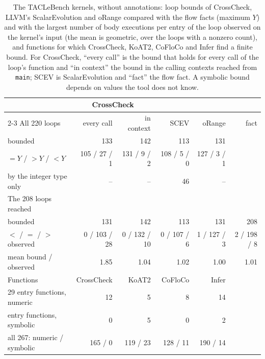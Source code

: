 \documentclass[oneside,english]{amsart}
\numberwithin{equation}{section}
\numberwithin{figure}{section}
\theoremstyle{plain}
\theoremstyle{definition}
\theoremstyle{plain}
\theoremstyle{remark}
\theoremstyle{plain}
\theoremstyle{definition}
\theoremstyle{plain}
\theoremstyle{remark}
\begin{document}
\begin{table}[ht]
\centering
\footnotesize
\setlength{\tabcolsep}{3.5pt}
\begin{tabular}{@{}lrrrrr@{}}
\toprule
 & \multicolumn{2}{c}{CrossCheck} & & & \\
\cmidrule(lr){2-3}
All 220 loops & every call & in context & SCEV & oRange & fact \\
\midrule
bounded & 133 & 142 & 113 & 131 & \\
\quad $= Y$ / $> Y$ / $< Y$ & 105 / 27 / 1 & 131 / 9 / 2 & 108 / 5 / 0 & 127 / 3 / 1 & \\
by the integer type only & -- & -- & 46 & -- & \\
\midrule
The 208 loops reached & & & & & \\
\midrule
bounded & 131 & 142 & 113 & 131 & 208 \\
\quad $<$ / $=$ / $>$ observed & 0 / 103 / 28 & 0 / 132 / 10 & 0 / 107 / 6 & 1 / 127 / 3 & 2 / 198 / 8 \\
\quad mean bound / observed & 1.85 & 1.04 & 1.02 & 1.00 & 1.01 \\
\midrule
Functions & CrossCheck & KoAT2 & CoFloCo & Infer & \\
\midrule
29 entry functions, numeric & 12 & 5 & 8 & 14 & \\
entry functions, symbolic & 0 & 5 & 0 & 2 & \\
all 267: numeric / symbolic & 165 / 0 & 119 / 23 & 128 / 11 & 190 / 14 & \\
\bottomrule
\end{tabular}
\caption{The TACLeBench kernels, without annotations: loop bounds of CrossCheck, LLVM's ScalarEvolution and oRange compared with the flow facts (maximum $Y$) and with the largest number of body executions per entry of the loop observed on the kernel's input (the mean is geometric, over the loops with a nonzero count), and functions for which CrossCheck, KoAT2, CoFloCo and Infer find a finite bound. For CrossCheck, ``every call'' is the bound that holds for every call of the loop's function and ``in context'' the bound in the calling contexts reached from \texttt{main}; SCEV is ScalarEvolution and ``fact'' the flow fact. A symbolic bound depends on values the tool does not know.}
\label{tab:tools}
\end{table}
\end{document}
